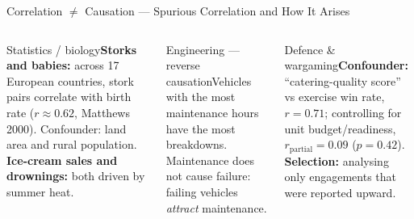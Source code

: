 \documentclass[aspectratio=169,10pt,t]{beamer}
\begin{document}
\begin{frame}{Correlation $\neq$ Causation --- Spurious Correlation and How It Arises}
\begin{columns}[T]
\begin{cbox}[ISSAamb]{Statistics / biology}\scriptsize \textbf{Storks and babies:} across 17 European countries, stork pairs correlate with birth rate ($r\approx0.62$, Matthews 2000). Confounder: land area and rural population. \textbf{Ice-cream sales and drownings:} both driven by summer heat.\end{cbox}
\begin{cbox}[ISSAred]{Engineering --- reverse causation}\scriptsize Vehicles with the most maintenance hours have the most breakdowns. Maintenance does not cause failure: failing vehicles \emph{attract} maintenance.\end{cbox}
\begin{cbox}[AccentCol]{Defence \& wargaming}\scriptsize \textbf{Confounder:} ``catering-quality score'' vs exercise win rate, $r=0.71$; controlling for unit budget/readiness, $r_{\text{partial}}=0.09$ ($p=0.42$). \textbf{Selection:} analysing only engagements that were reported upward.\end{cbox}

\end{columns}
\end{frame}
\end{document}
